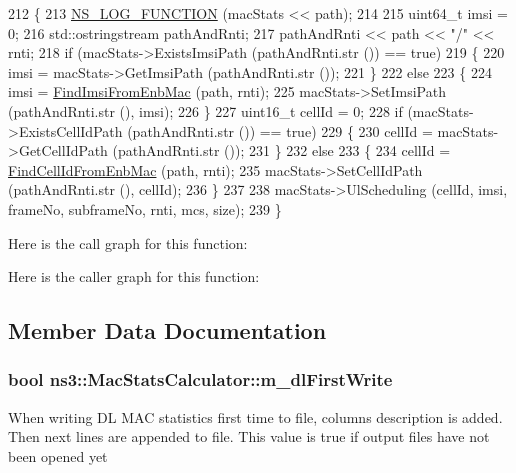 \begin{DoxyCode}
212 \{
213   \hyperlink{log-macros-disabled_8h_a90b90d5bad1f39cb1b64923ea94c0761}{NS\_LOG\_FUNCTION} (macStats << path);
214 
215   uint64\_t imsi = 0;
216   std::ostringstream pathAndRnti;
217   pathAndRnti << path << \textcolor{stringliteral}{"/"} << rnti;
218   \textcolor{keywordflow}{if} (macStats->ExistsImsiPath (pathAndRnti.str ()) == \textcolor{keyword}{true})
219     \{
220       imsi = macStats->GetImsiPath (pathAndRnti.str ());
221     \}
222   \textcolor{keywordflow}{else}
223     \{
224       imsi = \hyperlink{classns3_1_1LteStatsCalculator_a9cad885eb21450cedca3f94d6cf191d8}{FindImsiFromEnbMac} (path, rnti);
225       macStats->SetImsiPath (pathAndRnti.str (), imsi);
226     \}
227   uint16\_t cellId = 0;
228   \textcolor{keywordflow}{if} (macStats->ExistsCellIdPath (pathAndRnti.str ()) == \textcolor{keyword}{true})
229     \{
230       cellId = macStats->GetCellIdPath (pathAndRnti.str ());
231     \}
232   \textcolor{keywordflow}{else}
233     \{
234       cellId = \hyperlink{classns3_1_1LteStatsCalculator_a87a9bc9d89913c21ef67854abeaf2dd3}{FindCellIdFromEnbMac} (path, rnti);
235       macStats->SetCellIdPath (pathAndRnti.str (), cellId);
236     \}
237 
238   macStats->UlScheduling (cellId, imsi, frameNo, subframeNo, rnti, mcs, size);
239 \}
\end{DoxyCode}


Here is the call graph for this function\+:




Here is the caller graph for this function\+:




\subsection{Member Data Documentation}
\subsubsection[{\texorpdfstring{m\+\_\+dl\+First\+Write}{m_dlFirstWrite}}]{\setlength{\rightskip}{0pt plus 5cm}bool ns3\+::\+Mac\+Stats\+Calculator\+::m\+\_\+dl\+First\+Write\hspace{0.3cm}{\ttfamily [private]}}\hypertarget{classns3_1_1MacStatsCalculator_a5374491bcea5d56f24be7e9cd0f98e3f}{}\label{classns3_1_1MacStatsCalculator_a5374491bcea5d56f24be7e9cd0f98e3f}
When writing DL M\+AC statistics first time to file, columns description is added. Then next lines are appended to file. This value is true if output files have not been opened yet 
